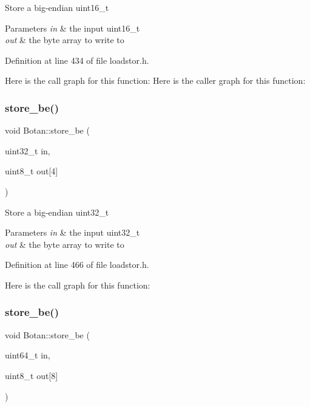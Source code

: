 Store a big-\/endian uint16\+\_\+t 
\begin{DoxyParams}{Parameters}
{\em in} & the input uint16\+\_\+t \\
\hline
{\em out} & the byte array to write to \\
\hline
\end{DoxyParams}


Definition at line 434 of file loadstor.\+h.

Here is the call graph for this function\+:
Here is the caller graph for this function\+:
\mbox{\label{namespace_botan_a237738c57bc371f45785750daad2cf7f}} 
\subsubsection{\texorpdfstring{store\+\_\+be()}{store\_be()}\hspace{0.1cm}{\footnotesize\ttfamily [2/6]}}
{\footnotesize\ttfamily void Botan\+::store\+\_\+be (\begin{DoxyParamCaption}\item[{uint32\+\_\+t}]{in,  }\item[{uint8\+\_\+t}]{out\mbox{[}4\mbox{]} }\end{DoxyParamCaption})\hspace{0.3cm}{\ttfamily [inline]}}

Store a big-\/endian uint32\+\_\+t 
\begin{DoxyParams}{Parameters}
{\em in} & the input uint32\+\_\+t \\
\hline
{\em out} & the byte array to write to \\
\hline
\end{DoxyParams}


Definition at line 466 of file loadstor.\+h.

Here is the call graph for this function\+:
\mbox{\label{namespace_botan_af55277e5a97f10bb1f19a121bfcce030}} 
\subsubsection{\texorpdfstring{store\+\_\+be()}{store\_be()}\hspace{0.1cm}{\footnotesize\ttfamily [3/6]}}
{\footnotesize\ttfamily void Botan\+::store\+\_\+be (\begin{DoxyParamCaption}\item[{uint64\+\_\+t}]{in,  }\item[{uint8\+\_\+t}]{out\mbox{[}8\mbox{]} }\end{DoxyParamCaption})\hspace{0.3cm}{\ttfamily [inline]}}

